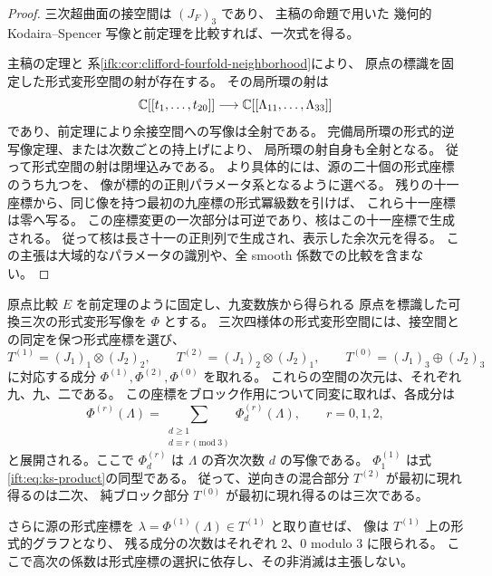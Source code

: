 \begin{proof}
三次超曲面の接空間は $(J_F)_3$ であり、
主稿の命題で用いた
幾何的 Kodaira--Spencer 写像と前定理を比較すれば、一次式を得る。

主稿の定理と
系\ref{ifk:cor:clifford-fourfold-neighborhood}により、
原点の標識を固定した形式変形空間の射が存在する。
その局所環の射は
\[
 \mathbb C[[t_1,\ldots,t_{20}]]\longrightarrow
             \mathbb C[[\Lambda_{11},\ldots,\Lambda_{33}]]
\]
であり、前定理により余接空間への写像は全射である。
完備局所環の形式的逆写像定理、または次数ごとの持上げにより、
局所環の射自身も全射となる。
従って形式空間の射は閉埋込みである。
より具体的には、源の二十個の形式座標のうち九つを、
像が標的の正則パラメータ系となるように選べる。
残りの十一座標から、同じ像を持つ最初の九座標の形式冪級数を引けば、
これら十一座標は零へ写る。
この座標変更の一次部分は可逆であり、核はこの十一座標で生成される。
従って核は長さ十一の正則列で生成され、表示した余次元を得る。
この主張は大域的なパラメータの識別や、全 smooth 係数での比較を含まない。
\end{proof}

\begin{proposition}
\label{ift:prop:block-jets}
原点比較 $E$ を前定理のように固定し、九変数族から得られる
原点を標識した可換三次の形式変形写像を $\Phi$ とする。
三次四様体の形式変形空間には、接空間との同定を保つ形式座標を選び、
\[
 T^{(1)}=(J_1)_1\otimes(J_2)_2,\qquad
 T^{(2)}=(J_1)_2\otimes(J_2)_1,\qquad
 T^{(0)}=(J_1)_3\oplus(J_2)_3
\]
に対応する成分 $\Phi^{(1)},\Phi^{(2)},\Phi^{(0)}$ を取れる。
これらの空間の次元は、それぞれ九、九、二である。
この座標をブロック作用について同変に取れば、各成分は
\begin{equation}\label{ift:eq:jet-weights}
 \Phi^{(r)}(\Lambda)
   =\sum_{\substack{d\ge1\\d\equiv r\ (\mathrm{mod}\ 3)}}
          \Phi^{(r)}_d(\Lambda),\qquad r=0,1,2,
\end{equation}
と展開される。ここで $\Phi^{(r)}_d$ は $\Lambda$ の斉次次数 $d$ の写像である。
$\Phi^{(1)}_1$ は式\eqref{ift:eq:ks-product}の同型である。
従って、逆向きの混合部分 $T^{(2)}$ が最初に現れ得るのは二次、
純ブロック部分 $T^{(0)}$ が最初に現れ得るのは三次である。

さらに源の形式座標を $\lambda=\Phi^{(1)}(\Lambda)\in T^{(1)}$ と取り直せば、
像は $T^{(1)}$ 上の形式的グラフとなり、
残る成分の次数はそれぞれ $2$、$0$ modulo $3$ に限られる。
ここで高次の係数は形式座標の選択に依存し、その非消滅は主張しない。
\end{proposition}

